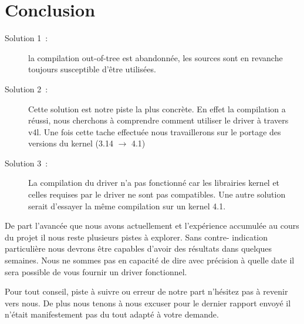 
\chapter{Conclusion} %

\label{Chapter6} %

\begin{description}
\item[Solution 1 :] la compilation out-of-tree est abandonnée, les sources sont
en revanche toujours susceptible d’être utilisées.

\item[Solution 2 :]Cette solution est notre piste la plus concrète. En effet la
compilation a réussi, nous cherchons à comprendre comment utiliser le driver à
travers v4l. Une fois cette tache effectuée nous travaillerons sur le portage
des versions du kernel (3.14 $\rightarrow$ 4.1)

\item[Solution 3 :]La compilation du driver n’a pas fonctionné car les librairies
 kernel et celles requises par le driver ne sont pas compatibles. Une autre
 solution serait d’essayer la même compilation sur un kernel 4.1.
\end{description}

De part l’avancée que nous avons actuellement et l’expérience accumulée au
cours du projet il nous reste plusieurs pistes à explorer. Sans contre-
indication particulière nous devrons être capables d’avoir des résultats dans
quelques semaines. Nous ne sommes pas en capacité de
dire avec précision à quelle date il sera possible de vous fournir un driver
fonctionnel.

Pour tout conseil, piste à suivre ou erreur de notre part n’hésitez pas à
revenir vers nous. De plus nous tenons à nous excuser pour le dernier rapport
envoyé il n’était manifestement pas du tout adapté à votre demande.
